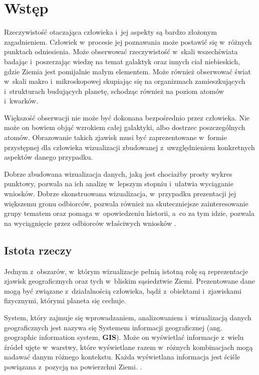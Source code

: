 \chapter{Wstęp}

Rzeczywistość otaczająca człowieka i~jej aspekty są bardzo złożonym zagadnieniem. Człowiek w~procesie jej poznawania może postawić się w~różnych punktach odniesienia. Może obserwować rzeczywistość w~skali wszechświata badając i~poszerzając wiedzę na temat galaktyk oraz innych ciał niebieskich, gdzie Ziemia jest pomijalnie małym elementem. Może również obserwować świat w~skali makro i~mikroskopowej skupiając się na organizmach zamieszkujących i~strukturach budujących planetę, schodząc również na poziom atomów i~kwarków. 

Większość obserwacji nie może być dokonana bezpośrednio przez człowieka. Nie może on bowiem objąć wzrokiem całej galaktyki, albo dostrzec poszczególnych atomów. Obrazowanie takich zjawisk musi być zaprezentowane w~formie przystępnej dla człowieka wizualizacji zbudowanej z~uwzględnieniem konkretnych aspektów danego przypadku. 

Dobrze zbudowana wizualizacja danych, jaką jest chociażby prosty wykres punktowy, pozwala na ich analizę w~lepszym stopniu i~ułatwia wyciąganie wniosków. Dobrze skonstruowana wizualizacja, w~przypadku prezentacji jej większemu gronu odbiorców, pozwala również na skuteczniejsze zainteresowanie grupy tematem oraz pomaga w~opowiedzeniu historii, a~co za tym idzie, pozwala na wyciągnięcie przez odbiorców właściwych wniosków \cite{StorytellingWithData}.

\section{Istota rzeczy}

Jednym z~obszarów, w~którym wizualizacje pełnią istotną rolę są reprezentacje zjawisk geograficznych oraz tych w~bliskim sąsiedztwie Ziemi. Prezentowane dane mogą być związane z~działalnością człowieka, bądź z~obiektami i~zjawiskami fizycznymi, którymi planeta się cechuje.

System, który zajmuje się wprowadzaniem, analizowaniem i~wizualizacją danych geograficznych jest nazywa się Systemem informacji geograficznej (ang. geographic information system, \textbf{GIS}). Może on wyświetlać informacje z~wielu źródeł ujęte w~warstwy, które wyświetlane razem w~różnych kombinacjach mogą nadawać danym różnego kontekstu. Każda wyświetlana informacja jest ściśle powiązana z~pozycją na powierzchni Ziemi. \cite[Rozdział 1.6]{IntroductionToHumanGeography}.

